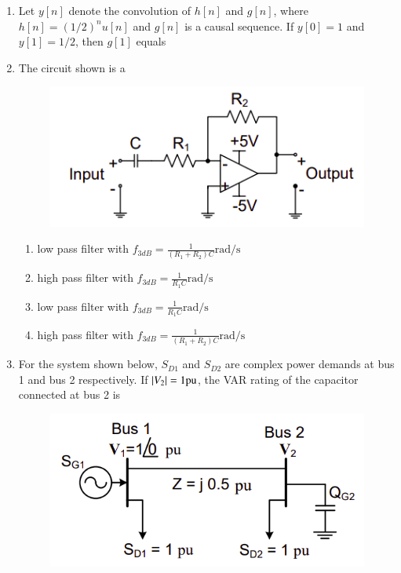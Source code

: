 \documentclass[journal,12pt,onecolumn]{IEEEtran}
\theoremstyle{remark}
\begin{document}
\begin{enumerate}[start=1, label=Q.\arabic*]
\item Let $y[n]$ denote the convolution of $h[n]$ and $g[n]$, where $h[n]=(1/2)^{n}u[n]$ and $g[n]$ is a causal sequence. If $y[0]=1$ and $y[1]=1/2$, then $g[1]$ equals

\begin{enumerate}
\end{enumerate}
\hfill{}

\item The circuit shown is a
\begin{figure}[H]
    \centering
    \includegraphics[width=0.4\columnwidth]{Figures/q32.png}
    \caption{}
\end{figure}

\begin{enumerate}
    \item low pass filter with $f_{3dB}=\frac{1}{(R_{1}+R_{2})C}\text{rad/s}$
    \item high pass filter with $f_{3dB}=\frac{1}{R_{1}C}\text{rad/s}$
    \item low pass filter with $f_{3dB}=\frac{1}{R_{1}C}\text{rad/s}$
    \item high pass filter with $f_{3dB}=\frac{1}{(R_{1}+R_{2})C}\text{rad/s}$
\end{enumerate}
\hfill{}

\item For the system shown below, $S_{D1}$ and $S_{D2}$ are complex power demands at bus 1 and bus 2 respectively. If $\left\vert V_{2}\right\vert=1\text{pu}$, the VAR rating of the capacitor  connected at bus 2 is
\begin{figure}[H]
    \centering
    \includegraphics[width=0.5\columnwidth]{Figures/q33.png}
    \caption{}
\end{figure}


\end{enumerate}
\end{document}
